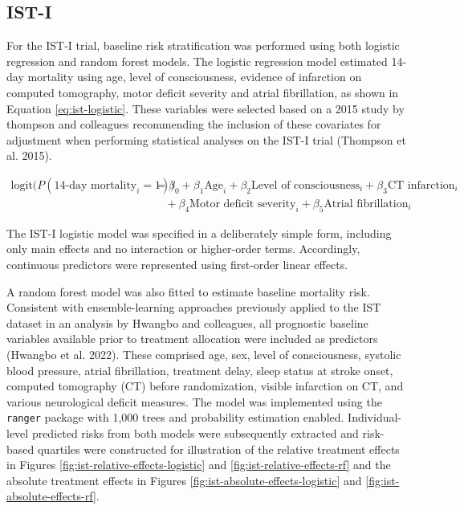 \documentclass{article}
\begin{document}
\subsection{IST-I}\label{ist-i}

For the IST-I trial, baseline risk stratification was performed using
both logistic regression and random forest models. The logistic
regression model estimated 14-day mortality using age, level of
consciousness, evidence of infarction on computed tomography, motor
deficit severity and atrial fibrillation, as shown in Equation
\ref{eq:ist-logistic}. These variables were selected based on a 2015
study by thompson and colleagues recommending the inclusion of these
covariates for adjustment when performing statistical analyses on the
IST-I trial (Thompson et al. 2015).

\begin{equation}
\begin{aligned}
\text{logit}\big(P(\text{14-day mortality}_i = 1)\big)
&=
\beta_0
+ \beta_1 \text{Age}_i
+ \beta_2 \text{Level of consciousness}_i
+ \beta_3 \text{CT infarction}_i \\
&\quad
+ \beta_4 \text{Motor deficit severity}_i
+ \beta_5 \text{Atrial fibrillation}_i
\end{aligned}
\label{eq:ist-logistic}
\end{equation}

The IST-I logistic model was specified in a deliberately simple form,
including only main effects and no interaction or higher-order terms.
Accordingly, continuous predictors were represented using first-order
linear effects.

A random forest model was also fitted to estimate baseline mortality
risk. Consistent with ensemble-learning approaches previously applied to
the IST dataset in an analysis by Hwangbo and colleagues, all prognostic
baseline variables available prior to treatment allocation were included
as predictors (Hwangbo et al. 2022). These comprised age, sex, level of
consciousness, systolic blood pressure, atrial fibrillation, treatment
delay, sleep status at stroke onset, computed tomography (CT) before
randomization, visible infarction on CT, and various neurological
deficit measures. The model was implemented using the \texttt{ranger}
package with 1,000 trees and probability estimation enabled.
Individual-level predicted risks from both models were subsequently
extracted and risk-based quartiles were constructed for illustration of
the relative treatment effects in Figures
\ref{fig:ist-relative-effects-logistic} and
\ref{fig:ist-relative-effects-rf} and the absolute treatment effects in
Figures \ref{fig:ist-absolute-effects-logistic} and
\ref{fig:ist-absolute-effects-rf}.
\end{document}
